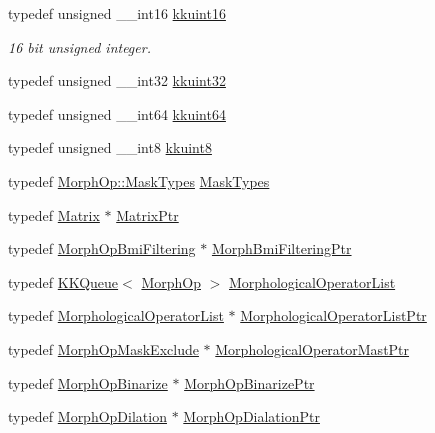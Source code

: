 \begin{DoxyCompactItemize}
\item 
typedef unsigned \+\_\+\+\_\+int16 \hyperlink{namespace_k_k_b_aa8c7d4d30381c8a0b6fce68974a9c8a9}{kkuint16}
\begin{DoxyCompactList}\small\item\em 16 bit unsigned integer. \end{DoxyCompactList}\item 
typedef unsigned \+\_\+\+\_\+int32 \hyperlink{namespace_k_k_b_af8d832f05c54994a1cce25bd5743e19a}{kkuint32}
\item 
typedef unsigned \+\_\+\+\_\+int64 \hyperlink{namespace_k_k_b_a1f2b0568d3b63cc7697dcff73250113e}{kkuint64}
\item 
typedef unsigned \+\_\+\+\_\+int8 \hyperlink{namespace_k_k_b_aebd95e29140dd9220a04bee9cabd648e}{kkuint8}
\item 
typedef \hyperlink{class_k_k_b_1_1_morph_op_a9eaa0383bf9e046da208af397e7e35eb}{Morph\+Op\+::\+Mask\+Types} \hyperlink{namespace_k_k_b_a87b867879b5d8efc10e79ef2ee395a3a}{Mask\+Types}
\item 
typedef \hyperlink{class_k_k_b_1_1_matrix}{Matrix} $\ast$ \hyperlink{namespace_k_k_b_a6e7c1ba6b19bffb29c885d2a62e7d235}{Matrix\+Ptr}
\item 
typedef \hyperlink{class_k_k_b_1_1_morph_op_bmi_filtering}{Morph\+Op\+Bmi\+Filtering} $\ast$ \hyperlink{namespace_k_k_b_a7a6cf481828e5a2ee888976a8c008ab8}{Morph\+Bmi\+Filtering\+Ptr}
\item 
typedef \hyperlink{class_k_k_b_1_1_k_k_queue}{K\+K\+Queue}$<$ \hyperlink{class_k_k_b_1_1_morph_op}{Morph\+Op} $>$ \hyperlink{namespace_k_k_b_a998f10e42621678ef0ad2f43b1ddb1ff}{Morphological\+Operator\+List}
\item 
typedef \hyperlink{namespace_k_k_b_a998f10e42621678ef0ad2f43b1ddb1ff}{Morphological\+Operator\+List} $\ast$ \hyperlink{namespace_k_k_b_a46af25bc9d36665c235609689cd53d42}{Morphological\+Operator\+List\+Ptr}
\item 
typedef \hyperlink{class_k_k_b_1_1_morph_op_mask_exclude}{Morph\+Op\+Mask\+Exclude} $\ast$ \hyperlink{namespace_k_k_b_aa31b27cc7c11d8b294b5c16d2991cd8b}{Morphological\+Operator\+Mast\+Ptr}
\item 
typedef \hyperlink{class_k_k_b_1_1_morph_op_binarize}{Morph\+Op\+Binarize} $\ast$ \hyperlink{namespace_k_k_b_a5e6559910c34fb493f7d8d85e487f747}{Morph\+Op\+Binarize\+Ptr}
\item 
typedef \hyperlink{class_k_k_b_1_1_morph_op_dilation}{Morph\+Op\+Dilation} $\ast$ \hyperlink{namespace_k_k_b_a75ffc0eccb20b566743f9a8ffcf86604}{Morph\+Op\+Dialation\+Ptr}

\end{DoxyCompactItemize}

